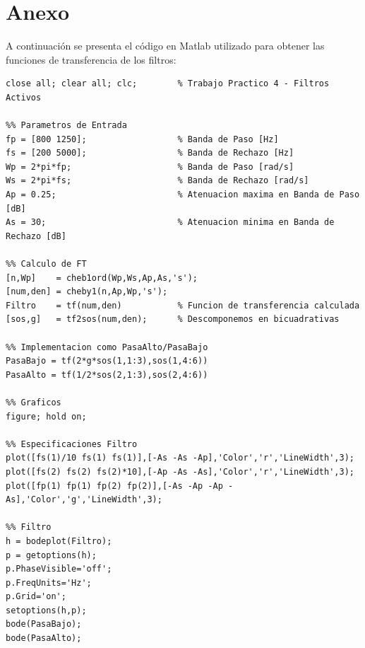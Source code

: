 \documentclass[12pt,a4paper]{article}
\begin{document}
\section{Anexo}
A continuación se presenta el código en Matlab utilizado para obtener las funciones de transferencia de los filtros:

\begin{lstlisting}[style=matlab]
close all; clear all; clc;        % Trabajo Practico 4 - Filtros Activos

%% Parametros de Entrada
fp = [800 1250];                  % Banda de Paso [Hz]
fs = [200 5000];                  % Banda de Rechazo [Hz]
Wp = 2*pi*fp;                     % Banda de Paso [rad/s]
Ws = 2*pi*fs;                     % Banda de Rechazo [rad/s]
Ap = 0.25;                        % Atenuacion maxima en Banda de Paso [dB]
As = 30;                          % Atenuacion minima en Banda de Rechazo [dB]

%% Calculo de FT
[n,Wp]    = cheb1ord(Wp,Ws,Ap,As,'s');
[num,den] = cheby1(n,Ap,Wp,'s');
Filtro    = tf(num,den)           % Funcion de transferencia calculada
[sos,g]   = tf2sos(num,den);      % Descomponemos en bicuadrativas

%% Implementacion como PasaAlto/PasaBajo
PasaBajo = tf(2*g*sos(1,1:3),sos(1,4:6))
PasaAlto = tf(1/2*sos(2,1:3),sos(2,4:6))

%% Graficos
figure; hold on;

%% Especificaciones Filtro
plot([fs(1)/10 fs(1) fs(1)],[-As -As -Ap],'Color','r','LineWidth',3);
plot([fs(2) fs(2) fs(2)*10],[-Ap -As -As],'Color','r','LineWidth',3);
plot([fp(1) fp(1) fp(2) fp(2)],[-As -Ap -Ap -As],'Color','g','LineWidth',3);

%% Filtro
h = bodeplot(Filtro);
p = getoptions(h);
p.PhaseVisible='off';
p.FreqUnits='Hz';
p.Grid='on';
setoptions(h,p);
bode(PasaBajo);
bode(PasaAlto);
\end{lstlisting}
\end{document}
